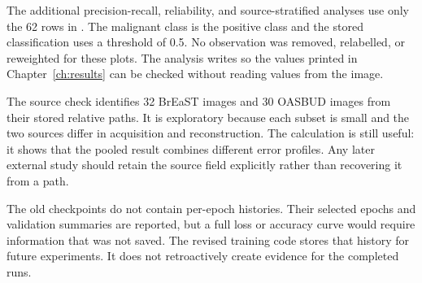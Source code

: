 The additional precision-recall, reliability, and source-stratified analyses use only the 62 rows in . The malignant class is the positive class and the stored classification uses a threshold of 0.5. No observation was removed, relabelled, or reweighted for these plots. The analysis writes  so the values printed in Chapter~\ref{ch:results} can be checked without reading values from the image.

The source check identifies 32 BrEaST images and 30 OASBUD images from their stored relative paths. It is exploratory because each subset is small and the two sources differ in acquisition and reconstruction. The calculation is still useful: it shows that the pooled result combines different error profiles. Any later external study should retain the source field explicitly rather than recovering it from a path.

The old checkpoints do not contain per-epoch histories. Their selected epochs and validation summaries are reported, but a full loss or accuracy curve would require information that was not saved. The revised training code stores that history for future experiments. It does not retroactively create evidence for the completed runs.
